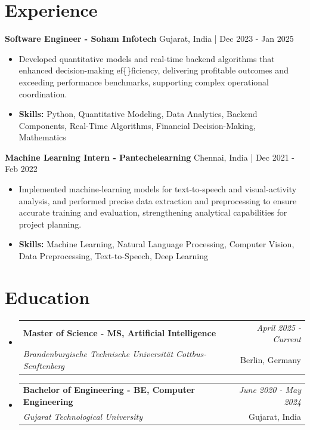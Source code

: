 \documentclass[a4paper,11pt]{article}
\makeatletter
\newcommand{\resumeSubheading}[4]{
\vspace{0.5mm}\item
    \begin{tabular*}{0.98\textwidth}[t]{l@{\extracolsep{\fill}}r}
        \textbf{#1} & \textit{\footnotesize{#4}} \\
        \textit{\footnotesize{#3}} &  \footnotesize{#2}\\
    \end{tabular*}
    \vspace{-2.4mm}
}
\makeatother
\begin{document}
\section{\textbf{Experience}}


\vspace{1mm}
  \textbf{Software Engineer - Soham Infotech} \hfill Gujarat, India | Dec 2023 - Jan 2025
\vspace{-1.5mm} %
\begin{itemize}
  \item Developed quantitative models and real-time backend algorithms that enhanced decision-making ef\{\}ficiency, delivering profitable outcomes and exceeding performance benchmarks, supporting complex operational coordination.

\vspace{-2mm}
  \item \textbf{Skills:} Python, Quantitative Modeling, Data Analytics, Backend Components, Real-Time Algorithms, Financial Decision-Making, Mathematics
\end{itemize}

\vspace{1mm}
  \textbf{Machine Learning Intern - Pantechelearning} \hfill Chennai, India | Dec 2021 - Feb 2022
\vspace{-1.5mm} %
\begin{itemize}
  \item Implemented machine-learning models for text-to-speech and visual-activity analysis, and performed precise data extraction and preprocessing to ensure accurate training and evaluation, strengthening analytical capabilities for project planning.
\vspace{-2mm}
  \item \textbf{Skills:} Machine Learning, Natural Language Processing, Computer Vision, Data Preprocessing, Text-to-Speech, Deep Learning
\end{itemize}\section{\textbf{Education}}
\vspace{-0.4mm}

\begin{itemize}
\resumeSubheading
{Master of Science - MS, Artificial Intelligence }{Berlin, Germany}
{Brandenburgische Technische Universität Cottbus-Senftenberg  }{April 2025 - Current}

\vspace{1.0mm} %
\resumeSubheading
{Bachelor of Engineering - BE, Computer Engineering  }{Gujarat, India}
{Gujarat Technological University }{June 2020 - May 2024}

\end{itemize}
\end{document}
